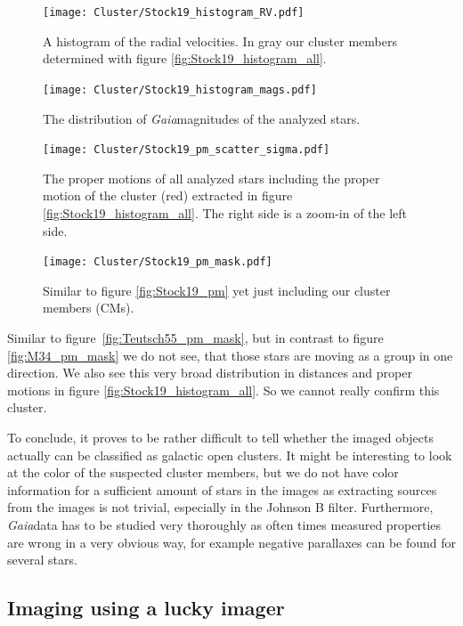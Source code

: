 \documentclass{article}
\begin{document}
\begin{figure}[H]
  \centering
    \texttt{[image: Cluster/Stock19\_histogram\_RV.pdf]}
  \caption{A histogram of the radial velocities. In gray our cluster members determined with figure \ref{fig:Stock19_histogram_all}.}
  \label{fig:Stock19_histogram_RV}
\end{figure}

\begin{figure}[H]
  \centering
    \texttt{[image: Cluster/Stock19\_histogram\_mags.pdf]}
  \caption{The distribution of \textit{Gaia}magnitudes of the analyzed stars.}
  \label{fig:Stock19_histogram_mags}
\end{figure}

\begin{figure}[H]
  \centering
    \texttt{[image: Cluster/Stock19\_pm\_scatter\_sigma.pdf]}
  \caption{The proper motions of all analyzed stars including the proper motion of the cluster (red) extracted in figure \ref{fig:Stock19_histogram_all}. The right side is a zoom-in of the left side.}
  \label{fig:Stock19_pm_scatter_sigma}
\end{figure}

\begin{figure}[H]
  \centering
    \texttt{[image: Cluster/Stock19\_pm\_mask.pdf]}
  \caption{Similar to figure \ref{fig:Stock19_pm} yet just including our cluster members (CMs).}
  \label{fig:Stock19_pm_mask}
\end{figure}

Similar to figure~\ref{fig:Teutsch55_pm_mask}, but in contrast to figure \ref{fig:M34_pm_mask} we do not see, that those stars are moving as a group in one direction. We also see this very broad distribution in distances and proper motions in figure \ref{fig:Stock19_histogram_all}. So we cannot really confirm this cluster.

To conclude, it proves to be rather difficult to tell whether the imaged objects actually can be classified as galactic open clusters. It might be interesting to look at the color of the suspected cluster members, but we do not have color information for a sufficient amount of stars in the images as extracting sources from the images is not trivial, especially in the Johnson B filter. Furthermore, \textit{Gaia}data has to be studied very thoroughly as often times measured properties are wrong in a very obvious way, for example negative parallaxes can be found for several stars.  

\subsection{Imaging using a lucky imager}
\end{document}
